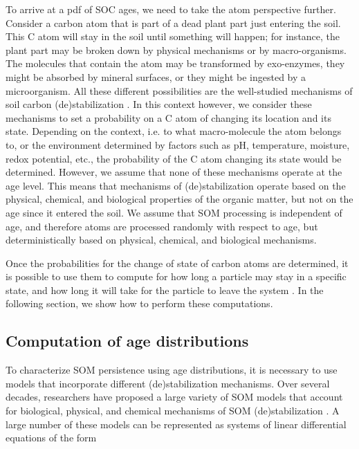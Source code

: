 \documentclass[draft,linenumbers]{agujournal}
\begin{document}
To arrive at a pdf of SOC ages, we need to take the atom perspective further. Consider a carbon atom that is part of a dead plant part just entering the soil. This C atom will stay in the soil until something will happen; for instance, the plant part may be broken down by physical mechanisms or by macro-organisms. The molecules that contain the atom may be transformed by exo-enzymes, they might be absorbed by mineral surfaces, or they might be ingested by a microorganism. All these different possibilities are the well-studied mechanisms of soil carbon (de)stabilization \citep{Sollins1996, vonLutzow2008, Schmidt2011, LehmannKleber}. In this context however, we consider these mechanisms to set a probability on a C atom of changing its location and its state. Depending on the context, i.e. to what macro-molecule the atom belongs to, or the environment determined by factors such as pH, temperature, moisture, redox potential, etc., the probability of the C atom changing its state would be determined. However, we assume that none of these mechanisms operate at the age level. This means that mechanisms of (de)stabilization operate based on the physical, chemical, and biological properties of the organic matter, but not on the age since it entered the soil. We assume that SOM processing is independent of age, and therefore atoms are processed randomly with respect to age, but deterministically based on physical, chemical, and biological mechanisms. 

Once the probabilities for the change of state of carbon atoms are determined, it is possible to use them to compute for how long a particle may stay in a specific state, and how long it will take for the particle to leave the system \citep{Metzler2018MG}. In the following section, we show how to perform these computations. 

\subsection{Computation of age distributions}
To characterize SOM persistence using age distributions, it is necessary to use models that incorporate different (de)stabilization mechanisms. Over several decades, researchers have proposed a large variety of SOM models that account for biological, physical, and chemical mechanisms of SOM (de)stabilization \citep{Manzoni2009SBB}. A large number of these models can be represented as systems of linear differential equations \citep{Sierra2015EM} of the form
\end{document}
